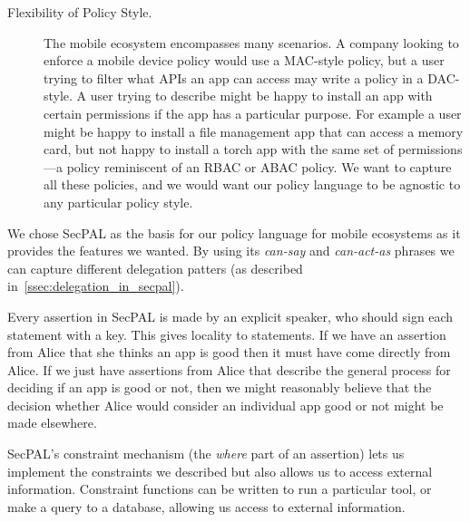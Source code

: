 \documentclass[thesis.tex]{subfiles}
\begin{document}
\begin{description}
\item[Flexibility of Policy Style.] The mobile ecosystem encompasses
many scenarios. A company looking to enforce a mobile device
policy would use a MAC-style policy, but a user trying to filter what
APIs an app can access may write a policy in a DAC-style. A user
trying to describe might be happy to install an app with certain
permissions if the app has a particular purpose. For example a user
might be happy to install a file management app that can access a
memory card, but not happy to install a torch app with the same set
of permissions---a policy reminiscent of an RBAC or ABAC policy. We
want to capture all these policies, and we would want our policy
language to be agnostic to any particular policy style.
\end{description}

We chose SecPAL as the basis for our policy language for mobile ecosystems as it
provides the features we wanted. By using its \emph{can-say} and
\emph{can-act-as} phrases we can capture different delegation patters (as
described in~\autoref{ssec:delegation_in_secpal}).

Every assertion in SecPAL is made by an explicit speaker, who should sign each
statement with a key. This gives locality to statements. If we have an assertion
from Alice that she thinks an app is good then it must have come directly from
Alice. If we just have assertions from Alice that describe the general process
for deciding if an app is good or not, then we might reasonably believe that the
decision whether Alice would consider an individual app good or not might
be made elsewhere.

SecPAL's constraint mechanism (the \emph{where} part of an assertion) lets us
implement the constraints we described but also allows us to access external
information. Constraint functions can be written to run a particular tool, or
make a query to a database, allowing us access to external information.
\end{document}
